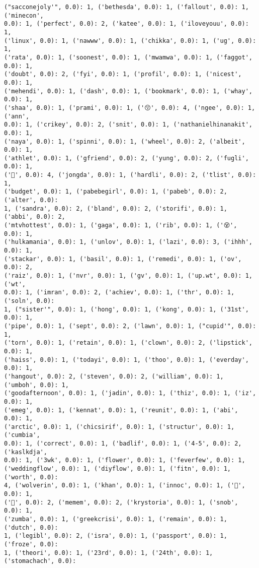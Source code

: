 \documentclass[11pt]{article}
\begin{document}
\begin{Verbatim}[commandchars=\\\{\}]
("sacconejoly'", 0.0): 1, ('bethesda', 0.0): 1, ('fallout', 0.0): 1, ('minecon',
0.0): 1, ('perfect', 0.0): 2, ('katee', 0.0): 1, ('iloveyouu', 0.0): 1,
('linux', 0.0): 1, ('nawww', 0.0): 1, ('chikka', 0.0): 1, ('ug', 0.0): 1,
('rata', 0.0): 1, ('soonest', 0.0): 1, ('mwamwa', 0.0): 1, ('faggot', 0.0): 1,
('doubt', 0.0): 2, ('fyi', 0.0): 1, ('profil', 0.0): 1, ('nicest', 0.0): 1,
('mehendi', 0.0): 1, ('dash', 0.0): 1, ('bookmark', 0.0): 1, ('whay', 0.0): 1,
('shaa', 0.0): 1, ('prami', 0.0): 1, ('😚', 0.0): 4, ('ngee', 0.0): 1, ('ann',
0.0): 1, ('crikey', 0.0): 2, ('snit', 0.0): 1, ('nathanielhinanakit', 0.0): 1,
('naya', 0.0): 1, ('spinni', 0.0): 1, ('wheel', 0.0): 2, ('albeit', 0.0): 1,
('athlet', 0.0): 1, ('gfriend', 0.0): 2, ('yung', 0.0): 2, ('fugli', 0.0): 1,
('💞', 0.0): 4, ('jongda', 0.0): 1, ('hardli', 0.0): 2, ('tlist', 0.0): 1,
('budget', 0.0): 1, ('pabebegirl', 0.0): 1, ('pabeb', 0.0): 2, ('alter', 0.0):
1, ('sandra', 0.0): 2, ('bland', 0.0): 2, ('storifi', 0.0): 1, ('abbi', 0.0): 2,
('mtvhottest', 0.0): 1, ('gaga', 0.0): 1, ('rib', 0.0): 1, ('😵', 0.0): 1,
('hulkamania', 0.0): 1, ('unlov', 0.0): 1, ('lazi', 0.0): 3, ('ihhh', 0.0): 1,
('stackar', 0.0): 1, ('basil', 0.0): 1, ('remedi', 0.0): 1, ('ov', 0.0): 2,
('raiz', 0.0): 1, ('nvr', 0.0): 1, ('gv', 0.0): 1, ('up.wt', 0.0): 1, ('wt',
0.0): 1, ('imran', 0.0): 2, ('achiev', 0.0): 1, ('thr', 0.0): 1, ('soln', 0.0):
1, ("sister'", 0.0): 1, ('hong', 0.0): 1, ('kong', 0.0): 1, ('31st', 0.0): 1,
('pipe', 0.0): 1, ('sept', 0.0): 2, ('lawn', 0.0): 1, ("cupid'", 0.0): 1,
('torn', 0.0): 1, ('retain', 0.0): 1, ('clown', 0.0): 2, ('lipstick', 0.0): 1,
('haiss', 0.0): 1, ('todayi', 0.0): 1, ('thoo', 0.0): 1, ('everday', 0.0): 1,
('hangout', 0.0): 2, ('steven', 0.0): 2, ('william', 0.0): 1, ('umboh', 0.0): 1,
('goodafternoon', 0.0): 1, ('jadin', 0.0): 1, ('thiz', 0.0): 1, ('iz', 0.0): 1,
('emeg', 0.0): 1, ('kennat', 0.0): 1, ('reunit', 0.0): 1, ('abi', 0.0): 1,
('arctic', 0.0): 1, ('chicsirif', 0.0): 1, ('structur', 0.0): 1, ('cumbia',
0.0): 1, ('correct', 0.0): 1, ('badlif', 0.0): 1, ('4-5', 0.0): 2, ('kaslkdja',
0.0): 1, ('3wk', 0.0): 1, ('flower', 0.0): 1, ('feverfew', 0.0): 1,
('weddingflow', 0.0): 1, ('diyflow', 0.0): 1, ('fitn', 0.0): 1, ('worth', 0.0):
4, ('wolverin', 0.0): 1, ('khan', 0.0): 1, ('innoc', 0.0): 1, ('🙏', 0.0): 1,
('🎂', 0.0): 2, ('memem', 0.0): 2, ('krystoria', 0.0): 1, ('snob', 0.0): 1,
('zumba', 0.0): 1, ('greekcrisi', 0.0): 1, ('remain', 0.0): 1, ('dutch', 0.0):
1, ('legibl', 0.0): 2, ('isra', 0.0): 1, ('passport', 0.0): 1, ('froze', 0.0):
1, ('theori', 0.0): 1, ('23rd', 0.0): 1, ('24th', 0.0): 1, ('stomachach', 0.0):

\end{Verbatim}
\end{document}
